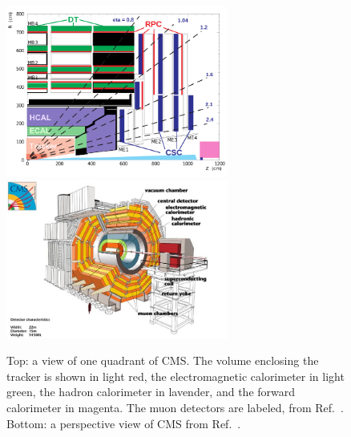 \begin{figure}[h!]
  \begin{center}
      \includegraphics[width=0.65\textwidth, trim = 2cm 0 0 0]{figures/cmsQuad.png}\\
      \includegraphics[width=0.65\textwidth,]{figures/CMS_Detector.jpg}
      \caption{\label{fig:cms} Top: a view of one quadrant of CMS. The volume enclosing 
      the tracker is shown in light red, the electromagnetic calorimeter in light green, 
      the hadron calorimeter in lavender, and the forward calorimeter in magenta. 
      The muon detectors are labeled, from Ref.~\cite{2012JInst...7P0002T}.
      Bottom: a perspective view of CMS from Ref.~\cite{1748-0221-3-08-S08004}.}
  \end{center}
\end{figure}

